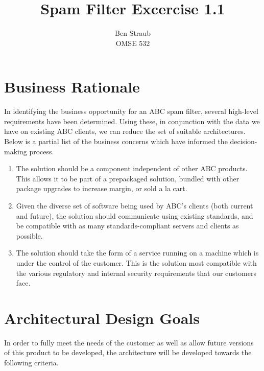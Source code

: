 \documentclass[11pt,letterpaper]{article}
\begin{document}
\author{Ben Straub\\OMSE 532}
\title{Spam Filter Excercise 1.1}
\maketitle


\section{Business Rationale}

In identifying the business opportunity for an ABC spam filter, several
high-level requirements have been determined.  Using these, in conjunction
with the data we have on existing ABC clients, we can reduce the set of
suitable architectures.  Below is a partial list of the business concerns
which have informed the decision-making process.

\begin{enumerate}
\item The solution should be a component independent of other ABC products.
  This allows it to be part of a prepackaged solution, bundled with other
  package upgrades to increase margin, or sold a la cart.
\item Given the diverse set of software being used by ABC's clients (both
  current and future), the solution should communicate using existing
  standards, and be compatible with as many standards-compliant servers and
  clients as possible.
\item The solution should take the form of a service running on a machine
  which is under the control of the customer.  This is the solution most
  compatible with the various regulatory and internal security requirements
  that our customers face.
\end{enumerate}


\section{Architectural Design Goals}

In order to fully meet the needs of the customer as well as allow future
versions of this product to be developed, the architecture will be developed
towards the following criteria.
\end{document}

